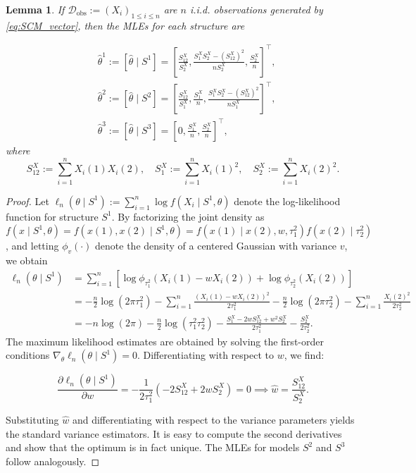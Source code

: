 \documentclass[accepted]{uai2026} %
\newcommand{\train}{\mathcal{D}}
\newcommand{\obsdata}{\train_{\text{obs}}}
\def\transpose{\intercal}
\newtheorem{lemma}{Lemma}[section]
\theoremstyle{boldremark}
\begin{document}
\begin{lemma}
    \label{lemma:MLE_nonident}
    If $\obsdata := (X_i)_{1\leq i \leq n}$ are $n$ i.i.d. observations generated by \eqref{eq:SCM_vector}, then the MLEs for each structure are

    \begin{align}
        &\hat{\theta}^1 := [\hat{\theta} \mid S^1] = \left[\frac{S^X_{12}}{S^X_2}, \frac{S_1^X S_2^X-(S^{X}_{12})^2}{nS^X_2}, \frac{S_2^X}{n}\right]^\transpose, \\
        &\hat{\theta}^2 := [\hat{\theta} \mid S^2] = \left[\frac{S_{12}^X}{S^X_1}, \frac{S^X_1}{n}, \frac{S_1^XS^X_2-(S_{12}^X)^2}{nS_1^X}\right]^\transpose, \\
        &\hat{\theta}^3 := [\hat{\theta} \mid S^3] = \left[0, \frac{S^X_1}{n}, \frac{S^X_2}{n}\right]^\transpose,
    \end{align}
    where
    \begin{equation}
        S^X_{12} := \sum_{i=1}^n X_i(1)X_i(2), \quad S_1^X:= \sum_{i=1}^n X_i(1)^2, \quad S^X_2:= \sum_{i=1}^n X_i(2)^2.
        \label{eq:def_S12_S1_S2}
    \end{equation}
    \label{lemma:log_lik_simple}
\end{lemma}

\begin{proof}
Let $\ell_n(\theta\mid S^1) := \sum_{i=1}^n\log f(X_i \mid S^1, \theta) $ denote the log-likelihood function for structure $S^1$. By factorizing the joint density as $f(x\mid S^1, \theta) = f(x(1), x(2)\mid S^1, \theta) = f(x(1)\mid x(2), w, \tau_1^2)f(x(2)\mid \tau_2^2)$, and letting $\phi_v(\cdot)$ denote the density of a centered Gaussian with variance $v$, we obtain
\begin{align*}
    \ell_n(\theta\mid S^1) &= \sum_{i=1}^n \left[ \log \phi_{\tau_1^2}(X_i(1)-wX_i(2)) + \log \phi_{\tau_2^2}(X_i(2)) \right] \\
    &= -\frac{n}{2}\log(2\pi \tau_1^2) - \sum_{i=1}^n \frac{(X_i(1)-wX_i(2))^2}{2\tau_1^2} -\frac{n}{2}\log(2\pi \tau_2^2) - \sum_{i=1}^n \frac{X_i(2)^2}{2\tau_2^2} \\
    &= -n\log(2\pi) - \frac{n}{2}\log(\tau_1^2\tau_2^2) - \frac{S_1^X-2wS^X_{12}+w^2S^X_2}{2\tau_1^2} - \frac{S^X_2}{2\tau_2^2}.
\end{align*}
The maximum likelihood estimates are obtained by solving the first-order conditions $\nabla_{\theta} \ell_n(\theta\mid S^1) = 0$. Differentiating with respect to $w$, we find:

\[
\frac{\partial \ell_n(\theta \mid S^1)}{\partial w} = -\frac{1}{2\tau_1^2}(-2S^X_{12} + 2wS^X_2) = 0 \implies \hat{w} = \frac{S^X_{12}}{S^X_2}.
\]

Substituting $\hat{w}$ and differentiating with respect to the variance parameters yields the standard variance estimators. It is easy to compute the second derivatives and show that the optimum is in fact unique. The MLEs for models $S^2$ and $S^3$ follow analogously.
\end{proof}
\end{document}
